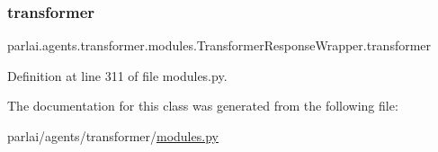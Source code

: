 \subsubsection{\texorpdfstring{transformer}{transformer}}
{\footnotesize\ttfamily parlai.\+agents.\+transformer.\+modules.\+Transformer\+Response\+Wrapper.\+transformer}



Definition at line 311 of file modules.\+py.



The documentation for this class was generated from the following file\+:\begin{DoxyCompactItemize}
\item 
parlai/agents/transformer/\hyperlink{parlai_2agents_2transformer_2modules_8py}{modules.\+py}\end{DoxyCompactItemize}
